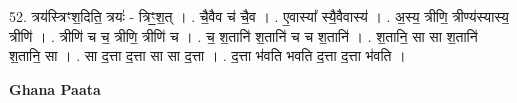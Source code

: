 \documentclass[17pt]{extarticle}
\begin{document}
52. त्रय॑स्त्रिꣳश॒दिति॒ त्रयः॑ - त्रिꣳ॒॒श॒त् । . चै॒वैव च॑ चै॒व । . ए॒वास्या᳚ स्यै॒वैवास्य॑ । . अ॒स्य॒ त्रीणि॒ त्रीण्य॑स्यास्य॒ त्रीणि॑ । . त्रीणि॑ च च॒ त्रीणि॒ त्रीणि॑ च । . च॒ श॒तानि॑ श॒तानि॑ च च श॒तानि॑ । . श॒तानि॒ सा सा श॒तानि॑ श॒तानि॒ सा । . सा द॒त्ता द॒त्ता सा सा द॒त्ता । . द॒त्ता भ॑वति भवति द॒त्ता द॒त्ता भ॑वति । \newline

\textbf{Ghana Paata } \newline
\end{document}
